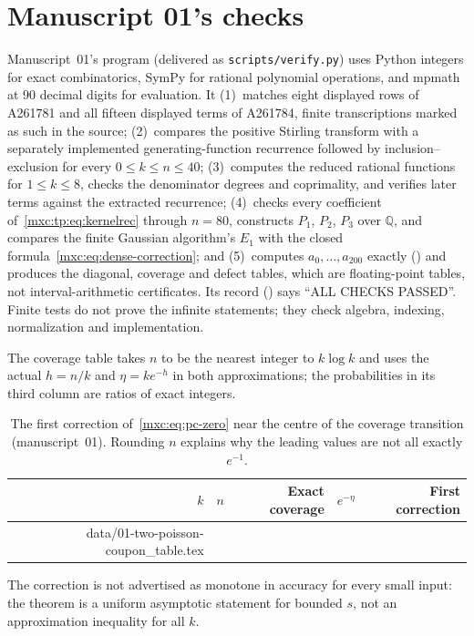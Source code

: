 \documentclass[11pt]{article}
\makeatletter
\numberwithin{equation}{section}
\theoremstyle{definition}
\theoremstyle{remark}
\newcommand{\tableinput}[1]{\@@input #1 }
\makeatother
\begin{document}
\section{Manuscript 01's checks}\label{mxc:tp:sec:checks}

Manuscript~01's program  (delivered
as \texttt{scripts/verify.py}) uses Python integers for exact
combinatorics, SymPy for rational polynomial operations, and mpmath at 90
decimal digits for evaluation. It
(1)~matches eight displayed rows of A261781 and all fifteen displayed
terms of A261784, finite transcriptions marked as such in the source;
(2)~compares the positive Stirling transform with a separately
implemented generating-function recurrence followed by
inclusion--exclusion for every $0\le k\le n\le40$;
(3)~computes the reduced rational functions for $1\le k\le8$, checks the
denominator degrees and coprimality, and verifies later terms against the
extracted recurrence;
(4)~checks every coefficient of~\eqref{mxc:tp:eq:kernelrec} through
$n=80$, constructs $P_1$, $P_2$, $P_3$ over $\mathbb Q$, and compares the
finite Gaussian algorithm's $E_1$ with the closed
formula~\eqref{mxc:eq:dense-correction}; and
(5)~computes $a_0,\ldots,a_{200}$ exactly
() and produces the diagonal,
coverage and defect tables, which are floating-point tables, not
interval-arithmetic certificates. Its record
() says ``ALL CHECKS
PASSED''. Finite tests do not prove the infinite statements; they check
algebra, indexing, normalization and implementation.

The coverage table takes $n$ to be the nearest integer to $k\log k$ and
uses the actual $h=n/k$ and $\eta=ke^{-h}$ in both approximations; the
probabilities in its third column are ratios of exact integers.
\begin{table}[htbp]
\centering\small
\begin{tabular}{@{}rrrrr@{}}
\toprule
$k$ & $n$ & Exact coverage & $e^{-\eta}$ & First correction\\
\midrule
\tableinput{data/01-two-poisson-coupon_table.tex}
\bottomrule
\end{tabular}
\caption{The first correction of~\eqref{mxc:eq:pc-zero} near the centre
of the coverage transition (manuscript~01). Rounding $n$ explains why the
leading values are not all exactly $e^{-1}$.}
\label{mxc:tp:tab:coupon}
\end{table}
The correction is not advertised as monotone in accuracy for every small
input: the theorem is a uniform asymptotic statement for bounded $s$, not
an approximation inequality for all $k$.
\end{document}
